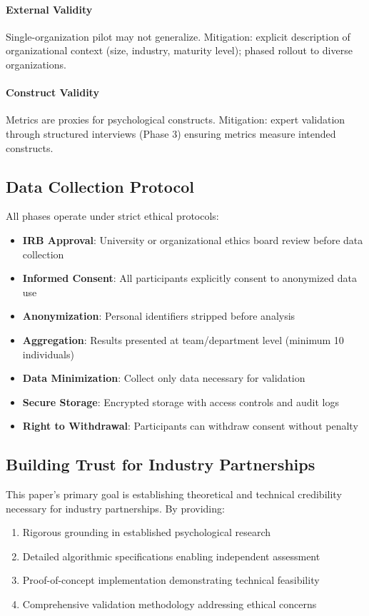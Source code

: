 \documentclass[11pt, a4paper]{article}
\begin{document}
\paragraph{External Validity}
Single-organization pilot may not generalize. Mitigation: explicit description of organizational context (size, industry, maturity level); phased rollout to diverse organizations.

\paragraph{Construct Validity}
Metrics are proxies for psychological constructs. Mitigation: expert validation through structured interviews (Phase 3) ensuring metrics measure intended constructs.

\subsection{Data Collection Protocol}

All phases operate under strict ethical protocols:
\begin{itemize}
\item \textbf{IRB Approval}: University or organizational ethics board review before data collection
\item \textbf{Informed Consent}: All participants explicitly consent to anonymized data use
\item \textbf{Anonymization}: Personal identifiers stripped before analysis
\item \textbf{Aggregation}: Results presented at team/department level (minimum 10 individuals)
\item \textbf{Data Minimization}: Collect only data necessary for validation
\item \textbf{Secure Storage}: Encrypted storage with access controls and audit logs
\item \textbf{Right to Withdrawal}: Participants can withdraw consent without penalty
\end{itemize}

\subsection{Building Trust for Industry Partnerships}

This paper's primary goal is establishing theoretical and technical credibility necessary for industry partnerships. By providing:
\begin{enumerate}
\item Rigorous grounding in established psychological research
\item Detailed algorithmic specifications enabling independent assessment
\item Proof-of-concept implementation demonstrating technical feasibility
\item Comprehensive validation methodology addressing ethical concerns
\end{enumerate}
\end{document}
